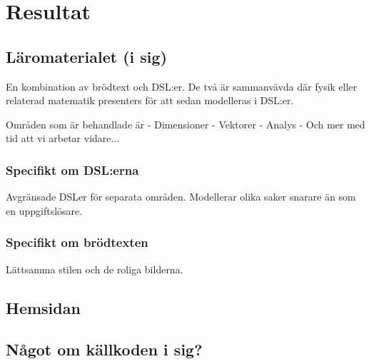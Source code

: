 
\chapter{Resultat}

\begin{binge}
\section{Läromaterialet (i sig)}

En kombination av brödtext och DSL:er. De två är sammanvävda där fysik eller relaterad matematik presenters för att sedan modelleras i DSL:er.

Områden som är behandlade är 
- Dimensioner
- Vektorer
- Analys
- Och mer med tid att vi arbetar vidare...

\subsection{Specifikt om DSL:erna}

Avgränsade DSLer för separata områden. Modellerar olika saker snarare än som en uppgiftslösare.

\subsection{Specifikt om brödtexten}

Lättsamma stilen och de roliga bilderna.

\section{Hemsidan}

\section{Något om källkoden i sig?}

\end{binge}